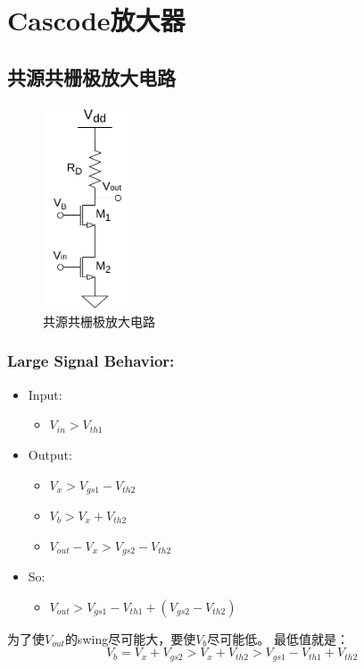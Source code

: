 \documentclass[twoside,a4paper,openright,titlepage,draft]{ctexrep}
\begin{document}
\section{Cascode放大器}
\subsection{共源共栅极放大电路}
\begin{multicols}{2}
    \begin{figure}[H]
        \centering
        \includegraphics[height=60mm]{commonsourcegate.drawio.pdf}
        \caption{共源共栅极放大电路}
        \label{fig:共源共栅极放大电路}
    \end{figure}
    \columnbreak
    \subsubsection{Large Signal Behavior:}
    \begin{itemize}
        \item Input:
        \begin{itemize}
            \item[] $V_{in} > V_{th1}$
        \end{itemize}
        \item Output:
        \begin{itemize}
            \item[] $V_{x} > V_{gs1} - V_{th2}$
            \item[] $V_b > V_x + V_{th2}$
            \item[] $V_{out} - V_x > V_{gs2} - V_{th2}$
        \end{itemize}
        \item So:
        \begin{itemize}
            \item[] $V_{out} > V_{gs1} - V_{th1} + (V_{gs2} - V_{th2})$
        \end{itemize}
    \end{itemize}
\end{multicols}
为了使$V_{out}$的swing尽可能大，要使$V_b$尽可能低。
最低值就是：
\begin{equation}
    V_b = V_x + V_{gs2} > V_x + V_{th2} > V_{gs1} - V_{th1} + V_{th2}
\end{equation}
\end{document}
